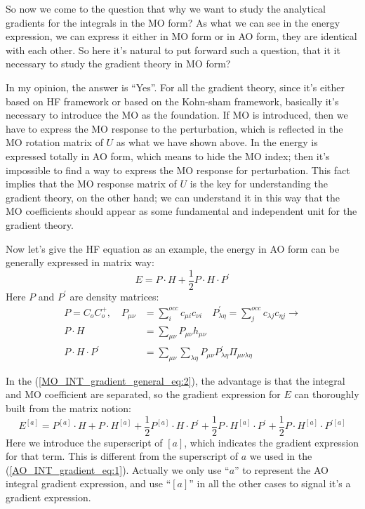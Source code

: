 So now we come to the question that why we want to study the analytical
gradients for the integrals in the MO form? As what we can see in the energy
expression, we can express it either in MO form or in AO form, they are
identical with each other. So here it's natural to put forward such a question,
that it it necessary to study the gradient theory in MO form?

In my opinion, the answer is ``Yes''. For all the gradient theory, since it's
either based on HF framework or based on the Kohn-sham framework, basically
it's necessary to introduce the MO as the foundation. If MO is introduced, then
we have to express the MO response to the perturbation, which is reflected in
the MO rotation matrix of $U$ as what we have shown above. In the energy is
expressed totally in AO form, which means to hide the MO index; then it's
impossible to find a way to express the MO response for perturbation.  This
fact implies that the MO response matrix of $U$ is the key for understanding
the gradient theory, on the other hand; we can understand it in this way that
the MO coefficients should appear as some fundamental and independent unit for
the gradient theory.

Now let's give the HF equation as an example, the energy in AO form can be
generally expressed in matrix way:
\begin{equation}
 \label{MO_INT_gradient_general_eq:2}
E = P\cdot H + \frac{1}{2} P\cdot H \cdot P^{'}
\end{equation}
Here $P$ and $P^{'}$ are density matrices:
\begin{align}
 \label{MO_INT_gradient_general_eq:3}
P = C_{o}C_{o}^{+},  \quad  P_{\mu\nu} &=   \sum_{i}^{occ}c_{\mu i}c_{\nu i}
\quad P^{'}_{\lambda\eta} =   \sum_{j}^{occ}c_{\lambda j}c_{\eta j}
\rightarrow\nonumber \\
P\cdot H  &= \sum_{\mu\nu}P_{\mu\nu}h_{\mu\nu} \nonumber \\
P\cdot H \cdot P^{'} &=
\sum_{\mu\nu}\sum_{\lambda\eta}P_{\mu\nu}P^{'}_{\lambda\eta}\Pi_{
\mu\nu\lambda\eta}
\end{align}

In the (\ref{MO_INT_gradient_general_eq:2}), the advantage is that the integral
and MO coefficient are separated, so the gradient expression for $E$ can
thoroughly built from the matrix notion:
\begin{equation}
\label{MO_INT_gradient_general_eq:4}
E^{[a]} = P^{[a]}\cdot H + P\cdot H^{[a]} + \frac{1}{2} P^{[a]}\cdot H \cdot
P^{'} + \frac{1}{2} P\cdot H^{[a]} \cdot P^{'} + \frac{1}{2} P\cdot H^{[a]}
\cdot P^{'[a]}
\end{equation}
Here we introduce the superscript of $[a]$, which indicates the gradient
expression for that term. This is different from the superscript of $a$ we used
in the (\ref{AO_INT_gradient_eq:1}). Actually we only use ``$a$'' to represent
the AO integral gradient expression, and use ``$[a]$'' in all the other cases
to signal it's a gradient expression.

